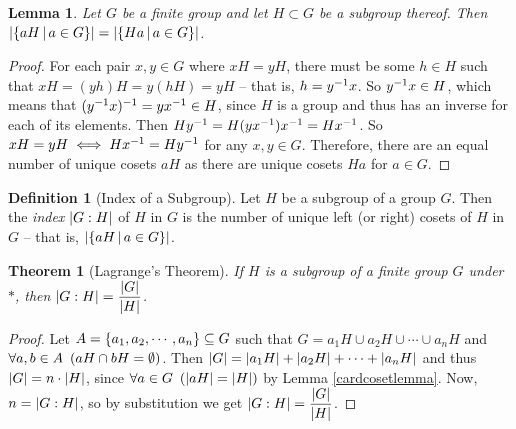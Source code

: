 \documentclass[a4paper,twoside,12pt,openany]{report}
\theoremstyle{plain}
\newtheorem{theorem}{Theorem}
\newtheorem{lemma}{Lemma}
\theoremstyle{definition}
\newtheorem{definition}{Definition}
\theoremstyle{remark}
\begin{document}
\begin{lemma}
	Let \(G\) be a finite group and let \(H\subset G\) be a subgroup thereof. Then \(\left|\left\{ aH \,\middle|\, a\in G \right\}\right|=\left|\left\{ Ha \,\middle|\, a\in G \right\}\right|\).
\end{lemma}

\begin{proof}
    For each pair \(x,y\in G\) where \(xH=yH\), there must be some \(h\in H\) such that \(xH=(yh)H=y(hH)=yH\) -- that is, \(h=y^{-1} x\). So \(y^{-1} x\in H\), which means that \((y^{-1} x)^{-1}=yx^{-1} \in H\), since \(H\) is a group and thus has an inverse for each of its elements. Then \(Hy^{-1}=H(yx^{-1})x^{-1}=Hx^{-1}\). So \(xH=yH \iff Hx^{-1}=Hy^{-1}\) for any \(x,y\in G\). Therefore, there are an equal number of unique cosets \(aH\) as there are unique cosets \(Ha\) for \(a\in G\).
\end{proof}

\begin{definition}[Index of a Subgroup]
	Let \(H\) be a subgroup of a group \(G\). Then the \emph{index} \(\left|G:H\right|\) of \(H\) in \(G\) is the number of unique left (or right) cosets of \(H\) in \(G\) -- that is, \(\left|\left\{ aH \,\middle|\, a\in G \right\}\right|\).
\end{definition}

\begin{theorem}[Lagrange's Theorem]
	If \(H\) is a subgroup of a finite group \(G\) under \(*\), then \(\left|G:H\right|=\dfrac{\left|G\right|}{\left|H\right|}\).
\end{theorem}

\begin{proof}
	Let \(A = \left\{ a_1,a_2,\cdots,a_n \right\} \subseteq G\) such that \(G=a_1H\cup a_2H\cup\cdots\cup a_nH\) and \(\forall a,b\in A\ \left(aH \cap bH = \emptyset\right)\). Then \(\left|G\right| = \left|a_1H\right|+ \left|a_2H\right|+\cdots+\left|a_nH\right|\) and thus \(\left|G\right| = n\cdot\left|H\right|\), since \(\forall a\in G\ \left(\left|aH\right|=\left|H\right|\right)\) by Lemma \ref{cardcosetlemma}. Now, \(n=\left|G:H\right|\), so by substitution we get \(\left|G:H\right|=\dfrac{\left|G\right|}{\left|H\right|}\).
\end{proof}
\end{document}

